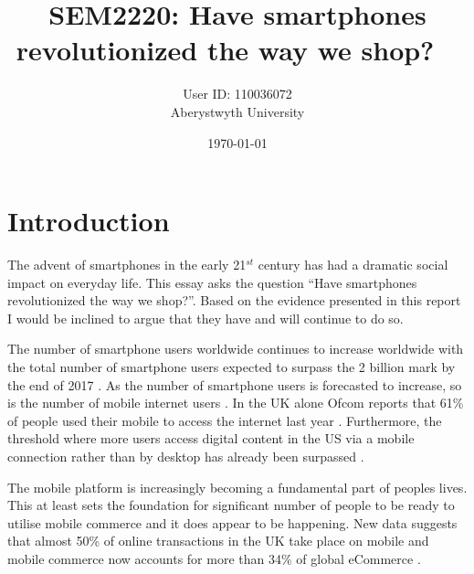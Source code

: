 \documentclass[paper=a4, fontsize=12pt]{scrartcl}	%
\title{
	\vspace{-0.5in} 	\usefont{OT1}{bch}{b}{n}
        SEM2220: Have smartphones revolutionized the way we shop? \
}
\author{
	\usefont{OT1}{bch}{m}{n} User ID: 110036072
	\\ \usefont{OT1}{bch}{m}{n} Aberystwyth University 
}
\date{\today}
\numberwithin{equation}{section}															%
\numberwithin{figure}{section}																%
\numberwithin{table}{section}
\begin{document}
\maketitle

\section{Introduction}
The advent of smartphones in the early 21$^{st}$ century has had a dramatic social impact on everyday life. This essay asks the question ``Have smartphones revolutionized the way we shop?''. Based on the evidence presented in this report I would be inclined to argue that they have and will continue to do so.

The number of smartphone users worldwide continues to increase worldwide with the total number of smartphone users expected to surpass the 2 billion mark by the end of 2017 \cite{emarketer2016smartphone}. As the number of smartphone users is forecasted to increase, so is the number of mobile internet users \cite{statista2016mobile}. In the UK alone Ofcom reports that 61\% of people used their mobile to access the internet last year \cite{ofcom2016facts}. Furthermore, the threshold where more users access digital content in the US via a mobile connection rather than by desktop has already been surpassed \cite{comscore2014us}. 

The mobile platform is increasingly becoming a fundamental part of peoples lives. This at least sets the foundation for significant number of people to be ready to utilise mobile commerce and it does appear to be happening. New data suggests that almost 50\% of online transactions in the UK take place on mobile \cite{econsultancy2016mobile} and mobile commerce now accounts for more than 34\% of global eCommerce \cite{criteo2015stateQ1, criteo2015stateQ4}.  
\end{document}
